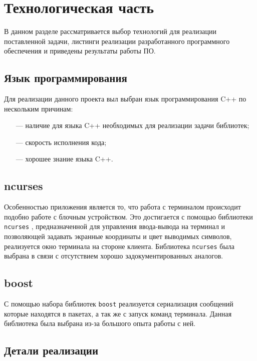 \chapter{Технологическая часть}

В данном разделе рассматривается выбор технологий для реализации поставленной задачи, листинги реализации разработанного программного обеспечения и приведены результаты работы ПО.

\section{Язык программирования}

Для реализации данного проекта выл выбран язык программирования C++ \cite{c++} по нескольким причинам:

\begin{itemize}
	\item[---] наличие для языка C++ необходимых для реализации задачи библиотек;
	\item[---] скорость исполнения кода;
	\item[---] хорошее знание языка C++.
\end{itemize}

\section{ncurses}

Особенностью приложения является то, что работа с терминалом происходит подобно работе с блочным устройством. Это достигается с помощью библиотеки \texttt{ncurses} \cite{ncurses}, предназначенной для управления ввода-вывода на терминал и позволяющей задавать экранные координаты и цвет выводимых символов, реализуется окно терминала на стороне клиента. Библиотека \texttt{ncurses} была выбрана в связи с отсутствием хорошо задокументированных аналогов.

\section{boost}

С помощью набора библиотек \texttt{boost} \cite{boost} реализуется сериализация сообщений которые находятся в пакетах, а так же с запуск команд терминала. Данная библиотека была выбрана из-за большого опыта работы с ней.

\section{Детали реализации}

